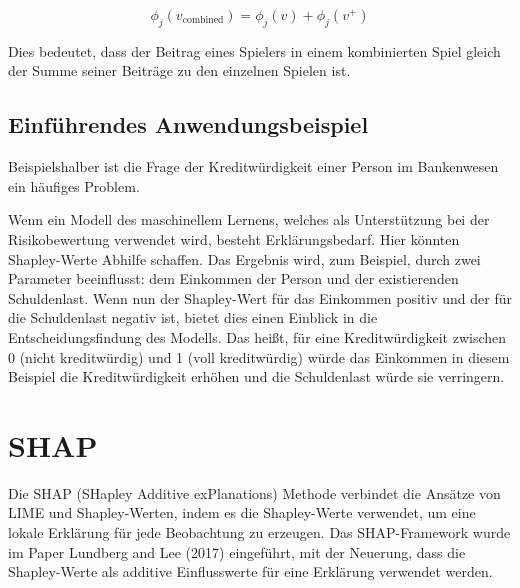 \documentclass[12pt,titlepage,oneside]{book}
\begin{document}
\begin{equation}
\phi_j(v_{\text{combined}}) = \phi_j(v) + \phi_j(v^+)
\end{equation}

Dies bedeutet, dass der Beitrag eines Spielers in einem kombinierten Spiel gleich der Summe seiner Beiträge zu den einzelnen Spielen ist.




\subsection{Einführendes Anwendungsbeispiel}
Beispielshalber ist die Frage der Kreditwürdigkeit einer Person im Bankenwesen ein häufiges Problem.

Wenn ein Modell des maschinellem Lernens, welches als Unterstützung bei der Risikobewertung verwendet wird, besteht Erklärungsbedarf. Hier könnten Shapley-Werte Abhilfe schaffen. Das Ergebnis wird, zum Beispiel, durch zwei Parameter beeinflusst: dem Einkommen der Person und der existierenden Schuldenlast. Wenn nun der Shapley-Wert für das Einkommen positiv und der für die Schuldenlast negativ ist, bietet dies einen Einblick in die Entscheidungsfindung des Modells. Das heißt, für eine Kreditwürdigkeit zwischen 0 (nicht kreditwürdig) und 1 (voll kreditwürdig) würde das Einkommen in diesem Beispiel die Kreditwürdigkeit erhöhen und die Schuldenlast würde sie verringern.



\newpage
\section{SHAP}
Die SHAP (SHapley Additive exPlanations) Methode verbindet die Ansätze von LIME und Shapley-Werten, indem es die Shapley-Werte verwendet, um eine lokale Erklärung für jede Beobachtung zu erzeugen. Das SHAP-Framework wurde im Paper Lundberg and Lee (2017) eingeführt, mit der Neuerung, dass die Shapley-Werte als additive Einflusswerte für eine Erklärung verwendet werden.
\end{document}
